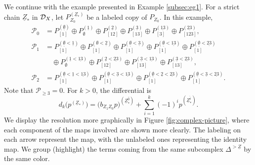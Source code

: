 \documentclass[a4paper,leqno]{amsart}
\begin{document}
\begin{eg}\label{subsec:eg2}
We continue with the example presented in Example \ref{subsec:eg1}. For a strict chain $\underline{Z}_\ast$ in $\mathcal D_X$, let $P_{Z_0}^{(\underline{Z}_\ast)}$ be a labeled copy of $P_{Z_0}$.  
In this example,
 \begin{align*}
 \mathcal P_0 & = P_{[1]}^{(\underline{\emptyset})}\oplus P_{\emptyset}^{(\underline{1})}\oplus P_{[12]}^{(\underline{2})}\oplus P_{[13]}^{(\underline{3})}\oplus P_{[3]}^{(\underline{13})}\oplus P_{[123]}^{(\underline{23})},\\
 \mathcal P_1 & = P_{[1]}^{(\underline{\emptyset}<\underline{1})}\oplus P_{[1]}^{(\emptyset<\underline{2})}\oplus P_{[1]}^{(\underline{\emptyset}<\underline{3})}  \oplus P_{[1]}^{(\underline{\emptyset}<\underline{13})}\oplus P_{[1]}^{(\underline{\emptyset}<\underline{23})}\\
 & \quad\oplus P_{\emptyset}^{(\underline{1}<\underline{13})}\oplus P_{[12]}^{(\underline{2}<\underline{23})}\oplus P_{[13]}^{(\underline{3}<\underline{13})}\oplus P_{[13]}^{(\underline{3}<\underline{23})},\\
 \mathcal P_2 & = P_{[1]}^{(\underline{\emptyset}<
 \underline{1}<
 \underline{13})}\oplus P_{[1]}^{(\underline{\emptyset}<
 \underline{3}<
 \underline{13})}\oplus P_{[1]}^{(\underline{\emptyset}<
 \underline{2}<
 \underline{23})}\oplus P_{[1]}^{(\underline{\emptyset}<
 \underline{3}<
 \underline{23})}.
\end{align*}
Note that $\mathcal P_{\ge 3}=0$.  For $k>0$, the differential is
\[
 d_k\bigl(p^{(\underline{Z}_\ast)}\bigr)=\bigl(b_{Z_1Z_0}p\bigr)^{(\underline{Z}_\ast^{\widehat{0}})}+\sum_{i=1}^{k}(-1)^ip^{(\underline{Z}_\ast^{\widehat{i}})}.
\]
We display the resolution more graphically in Figure \ref{fig:complex-picture}, where each component of the maps involved are shown more clearly.  The labeling on each arrow represent the map, with the unlabeled ones representing the identity map.  We group (highlight) the terms coming from the same subcomplex $\Delta^{>\underline{Z}}$ by the same color. 

\begin{figure}
    \centering
\end{figure}
\end{eg}
\end{document}

